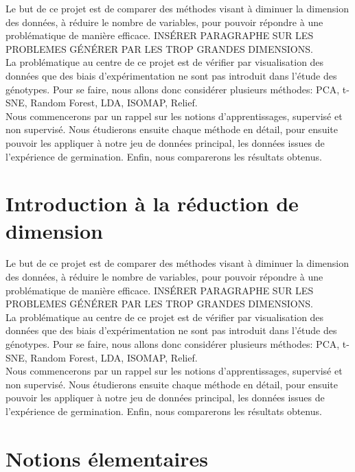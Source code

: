 \documentclass[12pt]{report}
\begin{document}
Le but de ce projet est de comparer des méthodes visant à diminuer la dimension des données, à réduire le nombre de variables, pour pouvoir répondre à une problématique de manière efficace. INSÉRER PARAGRAPHE SUR LES PROBLEMES GÉNÉRER PAR LES TROP GRANDES DIMENSIONS. \\

La problématique au centre de ce projet est de vérifier par visualisation des données que des biais d'expérimentation ne sont pas introduit dans l'étude des génotypes. 
Pour se faire, nous allons donc considérer plusieurs méthodes:  PCA, t-SNE, Random Forest, LDA, ISOMAP, Relief. \\

Nous commencerons par un rappel sur les notions d'apprentissages, supervisé et non supervisé.
Nous étudierons ensuite chaque méthode en détail, pour ensuite pouvoir les appliquer à notre jeu de données principal, les données issues de l'expérience de germination.
Enfin, nous comparerons les résultats obtenus.


\section*{Introduction à la réduction de dimension}

Le but de ce projet est de comparer des méthodes visant à diminuer la dimension des données, à réduire le nombre de variables, pour pouvoir répondre à une problématique de manière efficace. INSÉRER PARAGRAPHE SUR LES PROBLEMES GÉNÉRER PAR LES TROP GRANDES DIMENSIONS. \\

La problématique au centre de ce projet est de vérifier par visualisation des données que des biais d'expérimentation ne sont pas introduit dans l'étude des génotypes. 
Pour se faire, nous allons donc considérer plusieurs méthodes:  PCA, t-SNE, Random Forest, LDA, ISOMAP, Relief. \\

Nous commencerons par un rappel sur les notions d'apprentissages, supervisé et non supervisé.
Nous étudierons ensuite chaque méthode en détail, pour ensuite pouvoir les appliquer à notre jeu de données principal, les données issues de l'expérience de germination.
Enfin, nous comparerons les résultats obtenus.

\section*{Notions élementaires}
\end{document}
